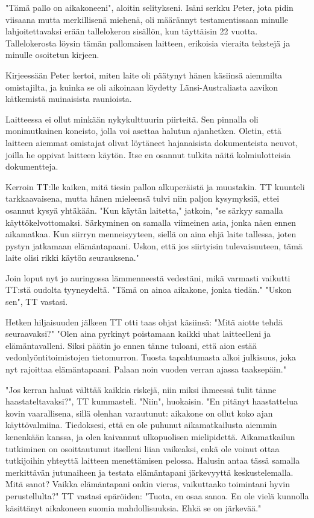 ﻿\documentclass[a4paper, 12pt, finnish]{article}
\begin{document}
"Tämä pallo on aikakoneeni", aloitin selitykseni.
Isäni serkku Peter, jota pidin viisaana mutta merkillisenä
miehenä, oli määrännyt testamentissaan minulle
lahjoitettavaksi erään tallelokeron sisällön,
kun täyttäisin 22 vuotta. Tallelokerosta
löysin tämän pallomaisen laitteen, erikoisia vieraita tekstejä
ja minulle osoitetun kirjeen.

Kirjeessään Peter kertoi, miten laite oli päätynyt hänen käsiinsä
aiemmilta omistajilta, ja kuinka se oli aikoinaan löydetty
Länsi-Australiasta aavikon kätkemistä muinaisista raunioista.

Laitteessa ei ollut minkään nykykulttuurin piirteitä.
Sen pinnalla oli monimutkainen koneisto,
jolla voi asettaa halutun ajanhetken. Oletin,
että laitteen aiemmat omistajat olivat löytäneet hajanaisista
dokumenteista neuvot, joilla he oppivat laitteen käytön.
Itse en osannut tulkita näitä kolmiulotteisia dokumentteja.

Kerroin TT:lle kaiken, mitä tiesin pallon alkuperäistä ja muustakin.
TT kuunteli tarkkaavaisena, mutta hänen mieleensä tulvi niin paljon
kysymyksiä, ettei osannut kysyä yhtäkään.
"Kun käytän laitetta," jatkoin, "se särkyy samalla käyttökelvottomaksi.
Särkyminen on samalla viimeinen asia, jonka näen ennen aikamatkaa.
Kun siirryn menneisyyteen, siellä on aina ehjä laite tallessa,
joten pystyn jatkamaan elämäntapaani. Uskon, että jos siirtyisin
tulevaisuuteen, tämä laite olisi rikki käytön seurauksena."

Join loput nyt jo auringossa lämmenneestä vedestäni,
mikä varmasti vaikutti TT:stä oudolta tyyneydeltä.
"Tämä on ainoa aikakone, jonka tiedän."
"Uskon sen", TT vastasi.

Hetken hiljaisuuden jälkeen TT otti taas ohjat käsiinsä:
"Mitä aiotte tehdä seuraavaksi?"
"Olen aina pyrkinyt poistamaan kaikki uhat laitteelleni
ja elämäntavalleni. Siksi päätin jo ennen tänne tuloani, että
aion estää vedonlyöntitoimistojen tietomurron. Tuosta
tapahtumasta alkoi julkisuus, joka nyt rajoittaa elämäntapaani.
Palaan noin vuoden verran ajassa taaksepäin."

"Jos kerran haluat välttää kaikkia riskejä, niin miksi
ihmeessä tulit tänne haastateltavaksi?", TT kummasteli.
"Niin", huokaisin. "En pitänyt haastattelua kovin vaarallisena,
sillä olenhan varautunut: aikakone on ollut koko ajan käyttövalmiina.
Tiedoksesi, että en ole puhunut aikamatkailusta aiemmin 
kenenkään kanssa, ja olen kaivannut ulkopuolisen mielipidettä.
Aikamatkailun tutkiminen on osoittautunut itselleni
liian vaikeaksi, enkä ole voinut ottaa tutkijoihin
yhteyttä laitteen menettämisen pelossa.
Halusin antaa tässä samalla merkittävän jutunaiheen ja
testata elämäntapani järkevyyttä keskustelemalla.
Mitä sanot? Vaikka elämäntapani onkin vieras,
vaikuttaako toimintani hyvin perustellulta?"
TT vastasi epäröiden: "Tuota, en osaa sanoa.
En ole vielä kunnolla käsittänyt aikakoneen suomia
mahdollisuuksia. Ehkä se on järkevää."
 
\end{document}
